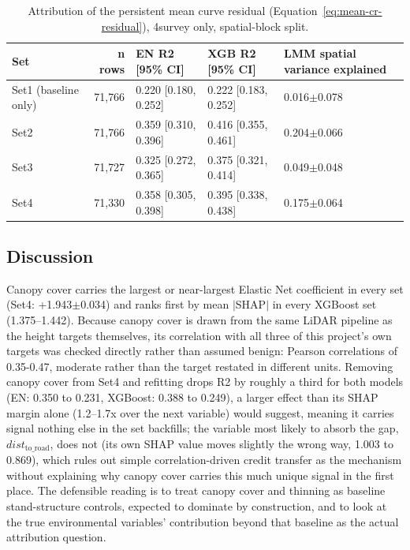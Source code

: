 \documentclass[logo,msc,ai]{infthesis}           %
\begin{document}
\begin{table}[!htbp]
\centering
\scriptsize
\renewcommand{\arraystretch}{1.2}
\begin{tabular}{lrlll}
\toprule
Set & n rows & EN R2 [95\% CI] & XGB R2 [95\% CI] & LMM spatial variance explained \\
\midrule
Set1 (baseline only) & 71{,}766 & 0.220 [0.180, 0.252] & 0.222 [0.183, 0.252] & 0.016$\pm$0.078 \\
Set2 & 71{,}766 & 0.359 [0.310, 0.396] & 0.416 [0.355, 0.461] & 0.204$\pm$0.066 \\
Set3 & 71{,}727 & 0.325 [0.272, 0.365] & 0.375 [0.321, 0.414] & 0.049$\pm$0.048 \\
Set4 & 71{,}330 & 0.358 [0.305, 0.398] & 0.395 [0.338, 0.438] & 0.175$\pm$0.064 \\
\bottomrule
\end{tabular}
\caption{\small{Attribution of the persistent mean curve residual (Equation~\ref{eq:mean-cr-residual}),
4survey only, spatial-block split.}}
\label{tab:results-rq2b} %
\end{table}

\subsection{Discussion}
Canopy cover carries the largest or near-largest Elastic Net coefficient in every set (Set4: +1.943$\pm$0.034) and ranks first by mean $|$SHAP$|$ in every XGBoost set (1.375--1.442). Because canopy cover is drawn from the same LiDAR pipeline as the height targets themselves, its correlation with all three of this project's own targets was checked directly rather than assumed benign: Pearson correlations of 0.35-0.47, moderate rather than the target restated in different units. Removing canopy cover from Set4 and refitting drops R2 by roughly a third for both models (EN: 0.350 to 0.231, XGBoost: 0.388 to 0.249), a larger effect than its SHAP margin alone (1.2--1.7x over the next variable) would suggest, meaning it carries signal nothing else in the set backfills; the variable most likely to absorb the gap, $\mathit{dist}_{\text{to\_road}}$, does not (its own SHAP value moves slightly the wrong way, 1.003 to 0.869), which rules out simple correlation-driven credit transfer as the mechanism without explaining why canopy cover carries this much unique signal in the first place. The defensible reading is to treat canopy cover and thinning as baseline stand-structure controls, expected to dominate by construction, and to look at the true environmental variables' contribution beyond that baseline as the actual attribution question. 
\end{document}
